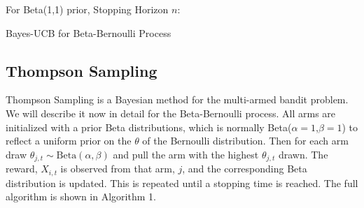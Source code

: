 \documentclass[journal,transmag]{IEEEtran}%
\begin{document}
\begin{algorithm}
 For Beta(1,1) prior, Stopping Horizon $n$: \\
 \caption{Bayes-UCB for Beta-Bernoulli Process}
\end{algorithm}


\subsection{Thompson Sampling}
Thompson Sampling is a Bayesian method for the multi-armed bandit problem. We will describe it now in detail for the Beta-Bernoulli process. All arms are initialized with a prior Beta distributions, which is normally Beta($\alpha=1$,$\beta =1$) to reflect a uniform prior on the $\theta$ of the Bernoulli distribution. Then for each arm draw $\theta_{j,t} \sim \mbox{Beta}(\alpha,\beta)$ and pull the arm with the highest $\theta_{j,t}$ drawn. The reward, $X_{i,t}$ is observed from that arm, $j$, and the corresponding Beta distribution is updated. This is repeated until a stopping time is reached. The full algorithm is shown in Algorithm 1.  
\end{document}
